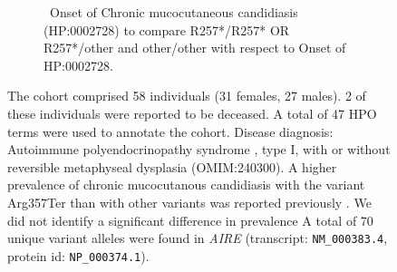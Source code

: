 \begin{figure}[htbp]
\vspace{2em}

\begin{subfigure}[b]{0.95\textwidth}
\captionsetup{justification=raggedright,singlelinecheck=false}
\caption{ Onset of Chronic mucocutaneous candidiasis (HP:0002728) to compare R257*/R257* OR R257*/other and other/other with respect to Onset of HP:0002728. }
\end{subfigure}

\vspace{2em}

\caption{ The cohort comprised 58 individuals (31 females, 27 males). 2 of these individuals were reported to be deceased. A total of 47 HPO terms were used to annotate the cohort. Disease diagnosis: Autoimmune polyendocrinopathy syndrome , type I, with or without reversible metaphyseal dysplasia (OMIM:240300). A
 higher prevalence of chronic mucocutanous candidiasis with the variant Arg357Ter than with other variants was reported previously \cite{PMID_12050215}. We did not identify a significant difference in prevalence A total of 70 unique variant alleles were found in \textit{AIRE} (transcript: \texttt{NM\_000383.4}, protein id: \texttt{NP\_000374.1}).}
\end{figure}
